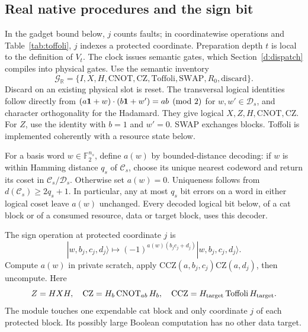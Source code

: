 \subsection{Real native procedures and the sign bit}
In the gadget bound below, \(j\) counts faults; in coordinatewise
operations and Table~\ref{tab:toffoli}, \(j\) indexes a protected
coordinate. Preparation depth \(t\) is local to the definition of \(V_t\).
The clock issues semantic gates, which Section~\ref{d:dispatch}
compiles into physical gates. Use the semantic inventory
\begin{equation}\label{d:native}
 \mathcal G_{\mathbb R}=
 \{I,X,H,\mathrm{CNOT},\mathrm{CZ},\mathrm{Toffoli},
                      \mathrm{SWAP},R_0,\text{discard}\}.
\end{equation}
Discard on an existing physical slot is reset. The transversal logical
identities follow directly from
\((a\mathbf 1+w)\cdot(b\mathbf 1+w')=ab\pmod2\) for
\(w,w'\in\mathcal D_s\), and character orthogonality for the Hadamard.
They give logical \(X,Z,H,\mathrm{CNOT},\mathrm{CZ}\). For \(Z\), use
the identity with \(b=1\) and \(w'=0\). SWAP exchanges blocks. Toffoli is implemented coherently with a resource state below.

For a basis word \(w\in\mathbb F_2^{n_s}\), define \(a(w)\) by
bounded-distance decoding: if \(w\) is within Hamming distance \(q_s\)
of \(\mathcal C_s\), choose its unique nearest codeword and return
its coset in \(\mathcal C_s/\mathcal D_s\). Otherwise set \(a(w)=0\).
Uniqueness follows from \(d(\mathcal C_s)\ge2q_s+1\). In particular,
any at most \(q_s\) bit errors on a word in either logical coset
leave \(a(w)\) unchanged. Every decoded logical bit below, of a cat
block or of a consumed resource, data or target block, uses this decoder.

The sign operation at protected coordinate \(j\) is
\begin{equation}\label{d:sign}
 |w,b_j,c_j,d_j\rangle\longmapsto
 (-1)^{a(w)(b_jc_j+d_j)}|w,b_j,c_j,d_j\rangle.
\end{equation}
Compute \(a(w)\) in private scratch, apply
\(\mathrm{CCZ}(a,b_j,c_j)\mathrm{CZ}(a,d_j)\), then uncompute.
Here
\[
 Z=HXH,\quad \mathrm{CZ}=H_b\,\mathrm{CNOT}_{ab}\,H_b,
 \quad \mathrm{CCZ}=H_{\rm target}\,\mathrm{Toffoli}\,H_{\rm target}.
\]
The module touches one expendable cat block and only coordinate \(j\)
of each protected block. Its possibly large Boolean computation has
no other data target.

